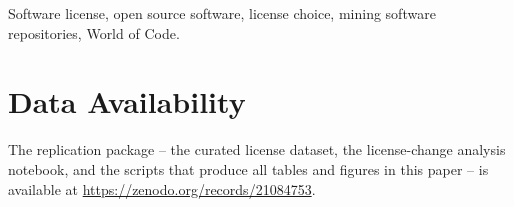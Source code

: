 \documentclass[10pt,conference]{IEEEtran}
\begin{document}
\begin{IEEEkeywords}
Software license, open source software, license choice, mining software repositories, World of Code.
\end{IEEEkeywords}








\section*{Data Availability}
The replication package -- the curated license dataset, the
license-change analysis notebook, and the scripts that produce all
tables and figures in this paper -- is available at
\url{https://zenodo.org/records/21084753}.


\clearpage
\clearpage


\end{document}
